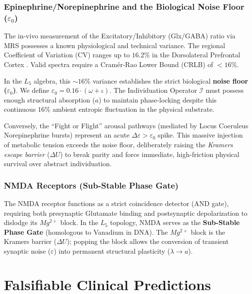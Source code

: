 \documentclass[12pt,oneside]{article}
\theoremstyle{principia}
\theoremstyle{definition}
\theoremstyle{remark}
\begin{document}
\subsubsection{Epinephrine/Norepinephrine and the Biological Noise Floor (\texorpdfstring{$\varepsilon_0$}{\varepsilon_0})}
The in-vivo measurement of the Excitatory/Inhibitory (Glx/GABA) ratio via MRS possesses a known physiological and technical variance. The regional Coefficient of Variation (CV) ranges up to $16.2\%$ in the Dorsolateral Prefrontal Cortex \cite{mrs_variance}. Valid spectra require a Cramér-Rao Lower Bound (CRLB) of $<16\%$.

In the $L_5$ algebra, this $\sim 16\%$ variance establishes the strict biological \textbf{noise floor ($\varepsilon_0$)}. We define $\varepsilon_0 = 0.16 \cdot (\omega+\iota)$. The Individuation Operator $\mathcal{I}$ must possess enough structural absorption ($a$) to maintain phase-locking despite this continuous $16\%$ ambient entropic fluctuation in the physical substrate. 

Conversely, the ``Fight or Flight'' arousal pathways (mediated by Locus Coeruleus Norepinephrine bursts) represent an acute $\Delta \varepsilon > \varepsilon_0$ spike. This massive injection of metabolic tension exceeds the noise floor, deliberately raising the \emph{Kramers escape barrier} ($\Delta U$) to break parity and force immediate, high-friction physical survival over abstract individuation.

\subsubsection{NMDA Receptors (Sub-Stable Phase Gate)}
The NMDA receptor functions as a strict coincidence detector (AND gate), requiring both presynaptic Glutamate binding and postsynaptic depolarization to dislodge its $Mg^{2+}$ block. In the $L_5$ topology, NMDA serves as the \textbf{Sub-Stable Phase Gate} (homologous to Vanadium in DNA). The $Mg^{2+}$ block is the Kramers barrier ($\Delta U$); popping the block allows the conversion of transient synaptic noise ($\varepsilon$) into permanent structural plasticity ($\lambda \to a$).

\section{Falsifiable Clinical Predictions}
\end{document}
